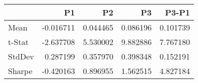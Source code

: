 \begin{tabular}{lrrrr}
\toprule
 & P1 & P2 & P3 & P3-P1 \\
\midrule
Mean & -0.016711 & 0.044465 & 0.086196 & 0.101739 \\
t-Stat & -2.637708 & 5.530002 & 9.882886 & 7.767180 \\
StdDev & 0.287199 & 0.357970 & 0.398348 & 0.152191 \\
Sharpe & -0.420163 & 0.896955 & 1.562515 & 4.827184 \\
\bottomrule
\end{tabular}
